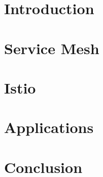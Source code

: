 \documentclass[conference]{IEEEtran}
\begin{document}
\section{Introduction} \label{sec:intro}
\cite{li2019service}

\section{Service Mesh} \label{sec:mesh}

\section{Istio} \label{sec:istio}

\section{Applications} \label{sec:app}

\section{Conclusion}



\end{document}

